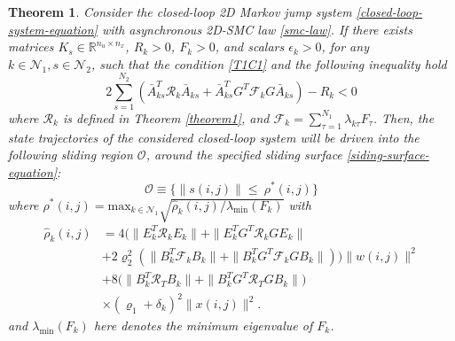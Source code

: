 \documentclass[conference]{IEEEtran}
\newtheorem{theorem}{Theorem}
\begin{document}
\begin{theorem}\label{theorem2}	
	Consider the closed-loop 2D Markov jump system \eqref{closed-loop-system-equation} with asynchronous 2D-SMC law \eqref{smc-law}. If there exists matrices $K_{s}\in\mathbb{R}^{n_u\times n_x}$, $R_{k}>0$, $F_{k}>0$, and  scalars $\epsilon_{k}>0$, for any $k\in\mathcal{N}_{1}, s\in\mathcal{N}_{2}$, such that the condition \eqref{T1C1} and the following inequality hold
	\begin{equation}
		2\sum_{s=1}^{N_{2}} (\bar{A}^{T}_{ks}\mathcal{R}_{k}\bar{A}_{ks}+ \bar{A}^{T}_{ks}G^{T}\mathcal{F}_{k}G\bar{A}_{ks})-R_{k} <0
	\end{equation}
	where $\mathcal{R}_{k}$ is defined in Theorem \ref{theorem1}, and $\mathcal{F}_{k}=\sum_{\tau=1}^{N_{1}}\lambda_{k\tau}F_{\tau}$. Then, the state trajectories of the considered closed-loop system will be driven into the following sliding region $\mathcal{O}$, around the specified sliding surface \eqref{siding-surface-equation}:
	\begin{equation}
		\mathcal{O}\equiv\Big\{\|s(i,j)\|\leq\ \rho^{*}(i,j) \Big\}
	\end{equation}
	where $\rho^{*}(i,j) = \mathrm{max}_{k\in\mathcal{N}_{1}}\sqrt{\hat{\rho}_{k}(i,j)/
	\lambda_{\mathrm{min}}(F_{k})}$ with
	\begin{equation*}
		 \begin{split}
		 	\hat{\rho}_{k}(i,j)&=4\big(\|E^{T}_{k}\mathcal{R}_{k}E_{k}\|+ \|E^{T}_{k}G^{T}\mathcal{R}_{k}GE_{k}\|\\
		 	&+2\varrho_{2}^{2}(\|B^{T}_{k}\mathcal{F}_{k}B_{k}\|+ \|B^{T}_{k}G^{T}\mathcal{F}_{k}GB_{k}\| )\big)\|w(i,j)\|^{2}\\
		 	&+8\big(\|B^{T}_{k}\mathcal{R}_{T}B_{k}\|+\|B^{T}_{k}G^{T}\mathcal{R}_{T}GB_{k}\|\big)\\ &\times(\varrho_{1}+\delta_{k})^{2}\|x(i,j)\|^{2}.
		 \end{split}
	\end{equation*}
	and $\lambda_{\mathrm{min}}(F_{k})$ here denotes the minimum eigenvalue of $F_{k}$.
\end{theorem} 
\end{document}

